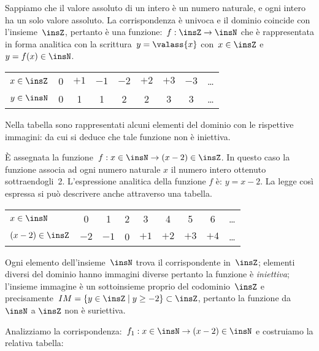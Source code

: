 \begin{exrig}
\begin{esempio}
Sappiamo che il valore assoluto di un intero è un numero naturale, e
ogni intero ha un solo valore assoluto. La corrispondenza è univoca e
il dominio coincide con l'insieme~$\insZ$, pertanto è una
funzione:~$f: \insZ\rightarrow\insN$ che è rappresentata in forma
analitica con la scrittura~${y=\valass{x}}$ con~$x\in\insZ$ e~$y=f(x)\in\insN$.

\begin{center}
\begin{tabular}{l*8{c}}
 \toprule
$x\in \insZ$ & 0 & $+1$ & $-1$ & $-2$ & $+2$ & $+3$ & $-3$ & \ldots\\
$y\in \insN$ & 0 & 1 & 1 & 2 & 2 & 3 & 3 & \ldots \\
\bottomrule
\end{tabular}
\end{center}
Nella tabella sono rappresentati alcuni elementi del dominio
con le rispettive immagini: da cui si deduce che tale funzione non è
iniettiva.
 \end{esempio}

 \begin{esempio}
 \label{ex:D.6}
È assegnata la funzione~$f:x\in \insN\rightarrow (x-2)\in\insZ$. In questo caso la funzione associa ad ogni numero naturale $x$ il
numero intero ottenuto sottraendogli~2. L'espressione analitica della funzione $f$ è: $y = x-2$. La legge così espressa si può descrivere anche attraverso una
tabella.

\begin{center}
\begin{tabular}{l*8{c}}
 \toprule
$x\in \insN$ & 0 & 1 & 2 & 3 & 4 & 5 & 6 & \ldots \\
$(x-2)\in \insZ$ & $-2$ & $-1$ & 0 & $+1$ & $+2$ & $+3$ & $+4$ & \ldots \\
\bottomrule
\end{tabular}
\end{center}

Ogni elemento dell'insieme~$\insN$ trova il corrispondente in~$\insZ$; elementi diversi del dominio hanno immagini diverse pertanto la
funzione è \emph{iniettiva}; l'insieme immagine è un sottoinsieme proprio del codominio~$\insZ$ e precisamente~$IM =\{y\in\insZ\mid y\ge -2\} \subset \insZ$,
pertanto la funzione da $\insN$ a $\insZ$ non è suriettiva.
 \end{esempio}

 \begin{esempio}
 \label{ex:D.7}
 Analizziamo la corrispondenza:~$f_{1}:x\in \insN\rightarrow (x-2)\in \insN$ e costruiamo la relativa tabella:


\end{esempio}
\end{exrig}
